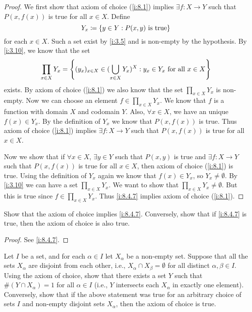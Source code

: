 \begin{proof}
  We first show that axiom of choice (\cref{i:8.1}) implies \(\exists f : X \to Y\) such that \(P(x, f(x))\) is true for all \(x \in X\).
  Define
  \[
    Y_x \coloneqq \left\lbrace y \in Y : P(x, y) \text{ is true}\right\rbrace
  \]
  for each \(x \in X\).
  Such a set exist by \cref{i:3.5} and is non-empty by the hypothesis.
  By \cref{i:3.10}, we know that the set
  \[
    \prod_{x \in X} Y_x = \left\lbrace(y_x)_{x \in X} \in (\bigcup_{x \in X} Y_x)^X : y_x \in Y_x \text{ for all } x \in X\right\rbrace
  \]
  exists.
  By axiom of choice (\cref{i:8.1}) we also know that the set \(\prod_{x \in X} Y_x\) is non-empty.
  Now we can choose an element \(f \in \prod_{x \in X} Y_x\).
  We know that \(f\) is a function with domain \(X\) and codomain \(Y\).
  Also, \(\forall x \in X\), we have an unique \(f(x) \in Y_x\).
  By the definition of \(Y_x\) we know that \(P(x, f(x))\) is true.
  Thus axiom of choice (\cref{i:8.1}) implies \(\exists f : X \to Y\) such that \(P(x, f(x))\) is true for all \(x \in X\).

  Now we show that if \(\forall x \in X\), \(\exists y \in Y\) such that \(P(x, y)\) is true and \(\exists f : X \to Y\) such that \(P(x, f(x))\) is true for all \(x \in X\), then axiom of choice (\cref{i:8.1}) is true.
  Using the definition of \(Y_x\) again we know that \(f(x) \in Y_x\), so \(Y_x \neq \emptyset\).
  By \cref{i:3.10} we can have a set \(\prod_{x \in X} Y_x\).
  We want to show that \(\prod_{x \in X} Y_x \neq \emptyset\).
  But this is true since \(f \in \prod_{x \in X} Y_x\).
  Thus \cref{i:8.4.7} implies axiom of choice (\cref{i:8.1}).
\end{proof}

\exercisesection

\begin{ex}\label{i:ex:8.4.1}
  Show that the axiom of choice implies \cref{i:8.4.7}.
  Conversely, show that if \cref{i:8.4.7} is true, then the axiom of choice is also true.
\end{ex}

\begin{proof}
  See \cref{i:8.4.7}.
\end{proof}

\begin{ex}\label{i:ex:8.4.2}
  Let \(I\) be a set, and for each \(\alpha \in I\) let \(X_{\alpha}\) be a non-empty set.
  Suppose that all the sets \(X_{\alpha}\) are disjoint from each other, i.e., \(X_{\alpha} \cap X_{\beta} = \emptyset\) for all distinct \(\alpha, \beta \in I\).
  Using the axiom of choice, show that there exists a set \(Y\) such that \(\#(Y \cap X_{\alpha}) = 1\) for all \(\alpha \in I\) (i.e., \(Y\) intersects each \(X_{\alpha}\) in exactly one element).
  Conversely, show that if the above statement was true for an arbitrary choice of sets \(I\) and non-empty disjoint sets \(X_{\alpha}\), then the axiom of choice is true.
\end{ex}

